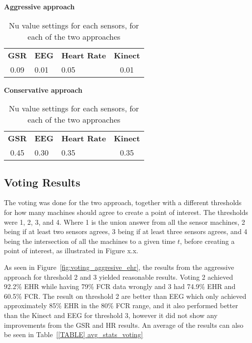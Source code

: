 \begin{table}[h]
  \centering
  \textbf{Aggressive approach}\vspace{2pt}
  \begin{tabularx}{\columnwidth}{cXXc}
    \toprule
    \textbf{GSR} & \textbf{EEG} & \textbf{Heart Rate} & \textbf{Kinect} \\
    0.09 & 0.01 & 0.05 & 0.01 \\
    \bottomrule
  \end{tabularx}

  \textbf{Conservative approach}\vspace{2pt}
  \begin{tabularx}{\columnwidth}{cXXc}
    \toprule
    \textbf{GSR} & \textbf{EEG} & \textbf{Heart Rate} & \textbf{Kinect} \\
    0.45 & 0.30 & 0.35 & 0.35 \\
    \bottomrule
  \end{tabularx}
  \caption{Nu value settings for each sensors, for each of the two approaches}
  \label{tab:nu_voting_settings}
\end{table}


\subsection{Voting Results}
The voting was done for the two approach, together with a different thresholds for how many machines should agree to create a point of interest.
The thresholds were 1, 2, 3, and 4. Where 1 is the union answer from all the sensor machines, 2 being if at least two sensors agrees, 3 being if at least three sensors agrees, and 4 being the intersection of all the machines to a given time $t$, before creating a point of interest, as illustrated in Figure x.x.




As seen in Figure~\ref{fig:voting_aggresive_ehr}, the results from the aggressive approach for threshold 2 and 3 yielded reasonable results.
Voting 2 achieved 92.2\% EHR while having 79\% FCR data wrongly and 3 had 74.9\% EHR and 60.5\% FCR.
The result on threshold 2 are better than EEG which only achieved approximately 85\% EHR in the 80\% FCR range, and it
also performed better than the Kinect and EEG for threshold 3, however it did not show any improvements from the GSR and
HR results.
An average of the results can also be seen in Table~\ref{[TABLE] avg_stats_voting}

